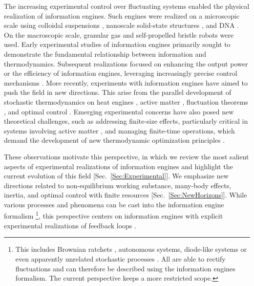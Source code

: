 \documentclass[aps, twocolumn,floatfix,showpacs, superscriptaddress]{revtex4-2}
\newcommand{\ie}{information engines }
\begin{document}
The increasing experimental control over fluctuating systems enabled the physical realization of information engines.
Such engines were realized on a microscopic scale using colloidal suspensions \cite{toyabe_experimental_2010, roldan_universal_2014, paneru_lossless_2018}, nanoscale solid-state structures \cite{koski_experimental_2014, chida_power_2017}, and DNA \cite{Ribezzi_Crivellari_2019}. On the macroscopic scale, granular gas \cite{lagoin_human-scale_2022} and self-propelled bristle robots \cite{Chor2023} were used.
Early experimental studies of information engines primarily sought to demonstrate the fundamental relationship between information and thermodynamics. Subsequent realizations focused on enhancing the output power or the efficiency of information engines, leveraging increasingly precise control mechanisms \cite{ashida_general_2014, paneru_optimal_2018, lucero_maximal_2021, saha2021maximizing, saha_bayesian_2022}. More recently, experiments with information engines have aimed to push the field in new directions.
This arise from the parallel development of stochastic thermodynamics on heat engines \cite{martinez2017colloidal}, active matter \cite{ramaswamy2003active, fodor2021active}, fluctuation theorems \cite{seifert2012stochastic, ciliberto2017experiments}, and optimal control \cite{schmiedl2007optimal, rosales2020optimal, pires2023optimal}. Emerging experimental concerns have also posed new theoretical challenges, such as addressing finite-size effects, particularly critical in systems involving active matter \cite{elgeti2015physics, krishnamurthy2016micrometre, solon2015pressure}, and managing finite-time operations, which demand the development of new thermodynamic optimization principles \cite{ParkOptimal2016, davis2024active}.

These observations motivate this perspective, in which we review the most salient aspects of experimental realizations of information engines and highlight the current evolution of this field [Sec.~\ref{Sec:Experimental}].
We emphasize new directions related to non-equilibrium working substance, many-body effects, inertia, and optimal control with finite resources [Sec.~\ref{Sec:NewHorizons}].
While various processes and phenomena can be cast into the information engine formalism \footnote{This includes Brownian ratchets \cite{reimann2002brownian}, autonomous systems, diode-like systems \cite{raizen_comprehensive_2009} or even apparently unrelated stochastic processes \cite{goerlich2023experimental, fuchs2016stochastic}. All are able to rectify fluctuations and can therefore be described using the \ie formalism. The current perspective keeps a more restricted scope.}, this perspective centers on \ie with explicit experimental realizations of feedback loops \cite{toyabe_experimental_2010, roldan_universal_2014,  paneru_lossless_2018, lee_experimentally-achieved_2018, Ribezzi_Crivellari_2019, paneru_efficiency_2020, saha2021maximizing, saha2023information, archambault2024inertial, archambault2024first}.
\end{document}
